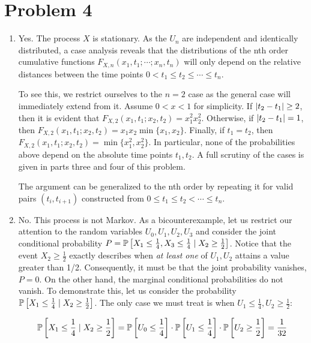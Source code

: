\documentclass[12pt]{article}%
\begin{document}
\section{Problem 4}
\begin{enumerate}
  \item Yes. The process $X$ is stationary. As the $U_n$ are independent and identically distributed, a case analysis reveals that the distributions of the nth order cumulative functions $F_{X,n}(x_1,t_1;\cdots;x_n,t_n)$ will only depend on the relative distances between the time points $0 < t_1 \leq t_{2} \leq \cdots \leq t_n$.

        To see this, we restrict ourselves to the $n=2$ case as the general case will immediately extend from it. Assume $0 < x < 1$ for simplicity. If $\abs{t_2 - t_1} \geq 2$, then it is evident that $F_{X,2}(x_1,t_1 ; x_2, t_2) = x_1^2x_2^2$. Otherwise, if $\abs{t_2 - t_1} = 1$, then $F_{X,2}(x_1,t_1 ; x_2, t_2) = x_1x_2 \min\{x_1,x_2\}$. Finally, if $t_1 = t_2$, then $F_{X,2}(x_1,t_1 ; x_2, t_2) = \min\{x_1^2,x_2^2\}$. In particular, none of the probabilities above depend on the absolute time points $t_1,t_2$. A full scrutiny of the cases is given in parts three and four of this problem.

        The argument can be generalized to the nth order by repeating it for valid pairs $(t_i, t_{i+1})$ constructed from $0 \leq t_1 \leq t_2 < \cdots \leq t_n$.


  \item
        No. This process is not Markov. As a  bicounterexample, let us restrict our attention to the random variables $U_{0},U_{1},U_{2},U_{3}$ and consider the joint conditional probability $P = \mathbb{P}\left[X_{1} \leq \frac{1}{4}, X_{3} \leq \frac{1}{4} \mid X_2 \geq \frac{1}{2}\right]$. Notice that the event $X_{2} \geq \frac{1}{2}$ exactly describes when \emph{at least one} of $U_{1},U_{2}$ attains a value greater than 1/2. Consequently, it must be that the joint probability vanishes, $P = 0$. On the other hand, the marginal conditional probabilities do not vanish. To demonstrate this, let us consider the probability $\mathbb{P}\left[X_{1} \leq \frac{1}{4} \mid X_{2} \geq \frac{1}{2}\right]$. The only case we must treat is when $U_{1} \leq \frac{1}{4}, U_{2} \geq \frac{1}{2}$:

        \[\mathbb{P}\left[X_{1} \leq \frac{1}{4} \mid X_{2} \geq \frac{1}{2}\right] = \mathbb{P}\left[U_{0} \leq \frac{1}{4}\right] \cdot \mathbb{P}\left[U_{1} \leq \frac{1}{4}\right] \cdot \mathbb{P}\left[U_{2} \geq \frac{1}{2}\right]  = \frac{1}{32}\]


\end{enumerate}
\end{document}
